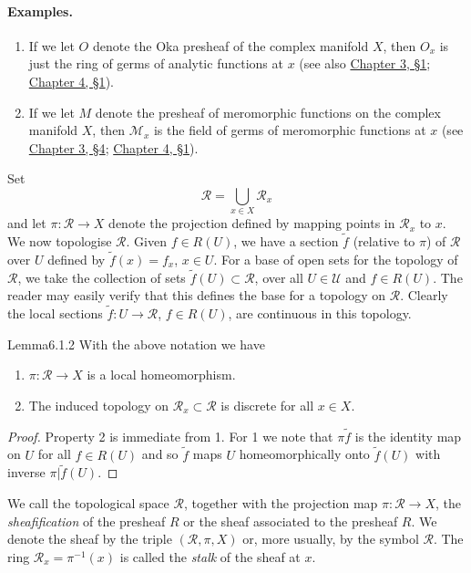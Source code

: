 \paragraph{Examples.}
\begin{enumerate}[start=7]
\item If we let $O$ denote the Oka presheaf of the complex manifold $X$, then $O_x$ is just the ring of germs of analytic functions at $x$ (see also \hyperref[sec:3:1]{Chapter 3, \S1}; \hyperref[sec:4:1]{Chapter 4, \S1}).
\item If we let $M$ denote the presheaf of meromorphic functions on the complex manifold $X$, then $\mathcal M_x$ is the field of germs of meromorphic functions at $x$ (see \hyperref[sec:3:4]{Chapter 3, \S4}; \hyperref[sec:4:1]{Chapter 4, \S1}).
\end{enumerate}
Set
\[
\mathcal R=\bigcup_{x\in X}\mathcal R_x
\]
and let $\pi:\mathcal R\to X$ denote the projection defined by mapping points in $\mathcal R_x$ to $x$. We now topologise $\mathcal R$. Given $f\in R(U)$, we have a section $\widetilde f$ (relative to $\pi$) of $\mathcal R$ over $U$ defined by $\widetilde f(x)=f_x$, $x\in U$. For a base of open sets for the topology of $\mathcal R$, we take the collection of sets $\widetilde f(U)\subset\mathcal R$, over all $U\in\mathcal U$ and $f\in R(U)$. The reader may easily verify that this defines the base for a topology on $\mathcal R$. Clearly the local sections $\widetilde f:U\to\mathcal R$, $f\in R(U)$, are continuous in this topology.

\begin{originaltheorem}{Lemma}{6.1.2}
With the above notation we have
\begin{enumerate}
\item $\pi:\mathcal R\to X$ is a local homeomorphism.
\item The induced topology on $\mathcal R_x\subset\mathcal R$ is discrete for all $x\in X$.
\end{enumerate}
\end{originaltheorem}
\begin{proof}
Property 2 is immediate from 1. For 1 we note that $\pi\widetilde f$ is the identity map on $U$ for all $f\in R(U)$ and so $\widetilde f$ maps $U$ homeomorphically onto $\widetilde f(U)$ with inverse $\pi|\widetilde f(U)$.
\end{proof}
We call the topological space $\mathcal R$, together with the projection map $\pi:\mathcal R\to X$, the \emph{sheafification} of the presheaf $R$ or the sheaf associated to the presheaf $R$. We denote the sheaf by the triple $(\mathcal R,\pi,X)$ or, more usually, by the symbol $\mathcal R$. The ring $\mathcal R_x=\pi^{-1}(x)$ is called the \emph{stalk} of the sheaf at $x$.


